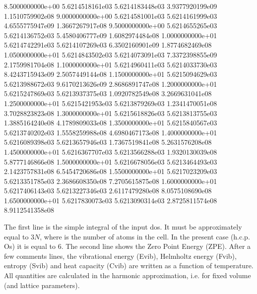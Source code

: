 \documentclass[letterpaper,10pt,english]{sphinxmanual}
\begin{document}
\begin{sphinxVerbatim}[commandchars=\\\{\}]
8.5000000000e+00	5.6214518161e\PYGZhy{}03	5.6214183448e\PYGZhy{}03	3.9377920199e\PYGZhy{}09	1.1510759902e\PYGZhy{}08
9.0000000000e+00	5.6214581001e\PYGZhy{}03	5.6214161999e\PYGZhy{}03	4.6555775947e\PYGZhy{}09	1.3667267917e\PYGZhy{}08
9.5000000000e+00	5.6214655265e\PYGZhy{}03	5.6214136752e\PYGZhy{}03	5.4580406777e\PYGZhy{}09	1.6082974484e\PYGZhy{}08
1.0000000000e+01	5.6214742291e\PYGZhy{}03	5.6214107269e\PYGZhy{}03	6.3502160901e\PYGZhy{}09	1.8774682469e\PYGZhy{}08
1.0500000000e+01	5.6214843502e\PYGZhy{}03	5.6214073091e\PYGZhy{}03	7.3372398855e\PYGZhy{}09	2.1759981704e\PYGZhy{}08
1.1000000000e+01	5.6214960411e\PYGZhy{}03	5.6214033730e\PYGZhy{}03	8.4243715943e\PYGZhy{}09	2.5057449144e\PYGZhy{}08
1.1500000000e+01	5.6215094629e\PYGZhy{}03	5.6213988672e\PYGZhy{}03	9.6170213626e\PYGZhy{}09	2.8686891747e\PYGZhy{}08
1.2000000000e+01	5.6215247869e\PYGZhy{}03	5.6213937375e\PYGZhy{}03	1.0920782549e\PYGZhy{}08	3.2669631041e\PYGZhy{}08
1.2500000000e+01	5.6215421953e\PYGZhy{}03	5.6213879269e\PYGZhy{}03	1.2341470051e\PYGZhy{}08	3.7028823823e\PYGZhy{}08
1.3000000000e+01	5.6215618826e\PYGZhy{}03	5.6213813755e\PYGZhy{}03	1.3885164240e\PYGZhy{}08	4.1789809033e\PYGZhy{}08
1.3500000000e+01	5.6215840567e\PYGZhy{}03	5.6213740202e\PYGZhy{}03	1.5558259988e\PYGZhy{}08	4.6980467173e\PYGZhy{}08
1.4000000000e+01	5.6216089398e\PYGZhy{}03	5.6213657946e\PYGZhy{}03	1.7367519841e\PYGZhy{}08	5.2631576208e\PYGZhy{}08
1.4500000000e+01	5.6216367707e\PYGZhy{}03	5.6213566288e\PYGZhy{}03	1.9320130039e\PYGZhy{}08	5.8777146866e\PYGZhy{}08
1.5000000000e+01	5.6216678056e\PYGZhy{}03	5.6213464493e\PYGZhy{}03	2.1423757831e\PYGZhy{}08	6.5454720686e\PYGZhy{}08
1.5500000000e+01	5.6217023209e\PYGZhy{}03	5.6213351785e\PYGZhy{}03	2.3686608350e\PYGZhy{}08	7.2705615875e\PYGZhy{}08
1.6000000000e+01	5.6217406143e\PYGZhy{}03	5.6213227346e\PYGZhy{}03	2.6117479280e\PYGZhy{}08	8.0575108690e\PYGZhy{}08
1.6500000000e+01	5.6217830073e\PYGZhy{}03	5.6213090314e\PYGZhy{}03	2.8725811574e\PYGZhy{}08	8.9112541358e\PYGZhy{}08
\end{sphinxVerbatim}

The first line is the simple integral of the input dos. It must be approximately equal to \(3N\), where  is the number of atoms in the cell. In the present case (h.c.p. Os) it is equal to 6. The second line shows the Zero Point Energy (ZPE). After a few comments lines, the vibrational energy (Evib), Helmholtz energy (Fvib), entropy (Svib) and heat capacity (Cvib) are written as a function of temperature. All quantities are calculated in the harmonic approximation, i.e. for fixed volume (and lattice parameters).
\end{document}
